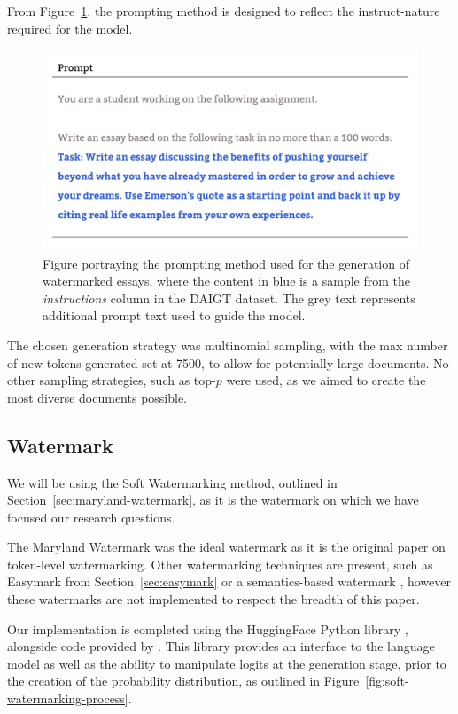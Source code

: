 \documentclass{l4proj}
\theoremstyle{definition}
\begin{document}
        From Figure~\ref{fig:prompting-method}, the prompting method is designed to reflect the instruct-nature required for the model.
        
        \begin{figure}[ht]
            \centering
            \includegraphics[height=6cm, width=1\linewidth, keepaspectratio]{images/methods/prompt-template.pdf}
            \caption{Figure portraying the prompting method used for the generation of watermarked essays, where the content in blue is a sample from the \emph{instructions} column in the DAIGT dataset. The grey text represents additional prompt text used to guide the model.}
            \label{fig:prompting-method}
        \end{figure}

        The chosen generation strategy was multinomial sampling, with the max number of new tokens generated set at 7500, to allow for potentially large documents. No other sampling strategies, such as top-$p$ were used, as we aimed to create the most diverse documents possible. 
        
    \subsection{Watermark}    
        \label{sec:watermark-implementation}
        We will be using the Soft Watermarking method, outlined in Section~\ref{sec:maryland-watermark}, as it is the watermark on which we have focused our research questions. 

        The Maryland Watermark was the ideal watermark as it is the original paper on token-level watermarking. Other watermarking techniques are present, such as Easymark from Section~\ref{sec:easymark} or a semantics-based watermark \citep{hou2024ksemstamp}, however these watermarks are not implemented to respect the breadth of this paper. 

        Our implementation is completed using the HuggingFace Python library \citep{wolf-etal-2020-transformers}, alongside code provided by \citet{kirchenbauer2023watermark}. This library provides an interface to the language model as well as the ability to manipulate logits at the generation stage, prior to the creation of the probability distribution, as outlined in Figure~\ref{fig:soft-watermarking-process}. 
\end{document}
